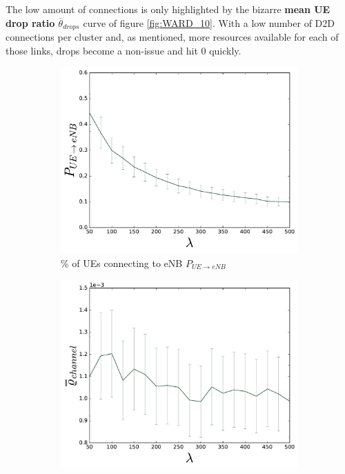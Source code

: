 The low amount of connections is only highlighted by the bizarre \textbf{mean UE drop ratio $\overline{\theta}_{drops}$} curve of figure \ref{fig:WARD_10}. With a low number of D2D connections per cluster and, as mentioned, more resources available for each of those links, drops become a non-issue and hit 0 quickly.

\begin{figure}[H]
  \begin{subfigure}[b]{0.5\linewidth}
    \centering
    \captionsetup{justification=centering}
    \includegraphics[width=1\linewidth]{figures/COMPLETE_2} 
    \caption{\% of UEs connecting to eNB $P_{UE\rightarrow eNB}$ }
    \label{fig:COMPLETE_2} 
    \vspace{4ex}
  \end{subfigure}%
  \begin{subfigure}[b]{0.5\linewidth}
    \centering
    \captionsetup{justification=centering}
    \includegraphics[width=1\linewidth]{figures/COMPLETE_8} 

\end{subfigure}
\end{figure}
